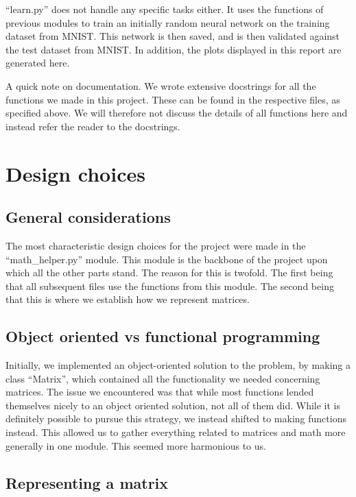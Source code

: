 \documentclass[letterpaper, 12 pt, conference]{ieeeconf}
\begin{document}
“learn.py” does not handle any specific tasks either. It uses the functions of previous modules to train an initially random neural network on the training dataset from MNIST. This network is then saved, and is then validated against the test dataset from MNIST. 
In addition, the plots displayed in this report are generated here. 

A quick note on documentation. We wrote extensive docstrings for all the functions we made in this project. These can be found in the respective files, as specified above. We will therefore not discuss the details of all functions here and instead refer the reader to the docstrings. 

\section{Design choices}

\subsection{General considerations}

The most characteristic design choices for the project were made in the “math\_helper.py” module. This module is the backbone of the project upon which all the other parts stand. The reason for this is twofold. The first being that all subsequent files use the functions from this module. The second being that this is where we establish how we represent matrices.

\subsection{Object oriented vs functional programming}

Initially, we implemented an object-oriented solution to the problem, by making a class “Matrix”, which contained all the functionality we needed concerning matrices. The issue we encountered was that while most functions lended themselves nicely to an object oriented solution, not all of them did. While it is definitely possible to pursue this strategy, we instead shifted to making functions instead. This allowed us to gather everything related to matrices and math more generally in one module. This seemed more harmonious to us. 

\subsection{Representing a matrix}
\end{document}
